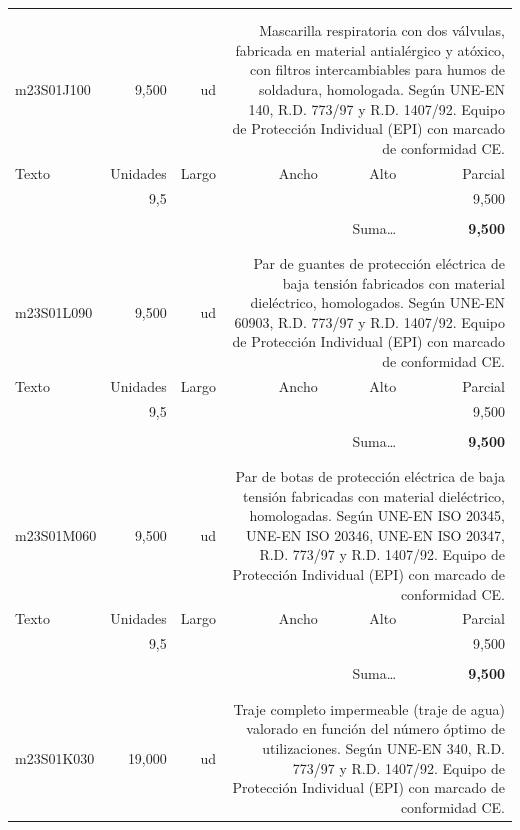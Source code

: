 \documentclass{book}%
\begin{document}
\begin{longtable}{lrrrrr}
\hline%
&&&&&\\%
&&&&&\\%
m23S01J100&     9,500& ud&\multicolumn{3}{p{6cm}}{\scriptsize Mascarilla respiratoria con dos válvulas, fabricada en material antialérgico y atóxico, con filtros intercambiables para humos de soldadura, homologada. Según UNE-EN 140, R.D. 773/97 y R.D. 1407/92. Equipo de Protección Individual (EPI) con marcado de conformidad CE.\normalsize}\\%
Texto&Unidades&Largo&Ancho&Alto&Parcial\\%
\hline%
\multicolumn{1}{p{3.5cm}}{ }&9,5&&&&     9,500\\%
&&&&&\\%
\multicolumn{5}{r}{Suma\ldots}&\textbf{     9,500}\\%
\hline%
&&&&&\\%
&&&&&\\%
m23S01L090&     9,500& ud&\multicolumn{3}{p{6cm}}{\scriptsize Par de guantes de protección eléctrica de baja tensión fabricados con material dieléctrico, homologados. Según UNE-EN 60903, R.D. 773/97 y R.D. 1407/92. Equipo de Protección Individual (EPI) con marcado de conformidad CE.\normalsize}\\%
Texto&Unidades&Largo&Ancho&Alto&Parcial\\%
\hline%
\multicolumn{1}{p{3.5cm}}{ }&9,5&&&&     9,500\\%
&&&&&\\%
\multicolumn{5}{r}{Suma\ldots}&\textbf{     9,500}\\%
\hline%
&&&&&\\%
&&&&&\\%
m23S01M060&     9,500& ud&\multicolumn{3}{p{6cm}}{\scriptsize Par de botas de protección eléctrica de baja tensión fabricadas con material dieléctrico, homologadas. Según UNE-EN ISO 20345, UNE-EN ISO 20346, UNE-EN ISO 20347, R.D. 773/97 y R.D. 1407/92. Equipo de Protección Individual (EPI) con marcado de conformidad CE.\normalsize}\\%
Texto&Unidades&Largo&Ancho&Alto&Parcial\\%
\hline%
\multicolumn{1}{p{3.5cm}}{ }&9,5&&&&     9,500\\%
&&&&&\\%
\multicolumn{5}{r}{Suma\ldots}&\textbf{     9,500}\\%
\hline%
&&&&&\\%
&&&&&\\%
m23S01K030&    19,000& ud&\multicolumn{3}{p{6cm}}{\scriptsize Traje completo impermeable (traje de agua) valorado en función del número óptimo de utilizaciones. Según UNE-EN 340, R.D. 773/97 y R.D. 1407/92. Equipo de Protección Individual (EPI) con marcado de conformidad CE.\normalsize}\\%

\end{longtable}
\end{document}
